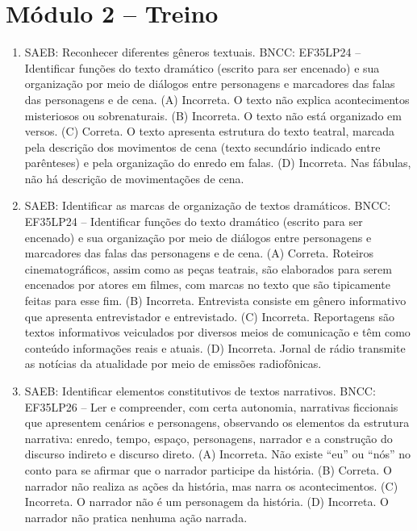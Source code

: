 \section*{Módulo 2 – Treino}

\begin{enumerate}
\item
SAEB: Reconhecer diferentes gêneros textuais.
BNCC: EF35LP24 -- Identificar funções do texto dramático (escrito para ser
encenado) e sua organização por meio de diálogos entre personagens e
marcadores das falas das personagens e de cena.
(A) Incorreta. O texto não explica acontecimentos misteriosos ou
sobrenaturais.
(B) Incorreta. O texto não está organizado em versos.
(C) Correta. O texto apresenta estrutura do texto teatral, marcada pela
descrição dos movimentos de cena (texto secundário indicado entre
parênteses) e pela organização do enredo em falas.
(D) Incorreta. Nas fábulas, não há descrição de movimentações de cena.

\item
SAEB: Identificar as marcas de organização de textos dramáticos.
BNCC: EF35LP24 -- Identificar funções do texto dramático (escrito para
ser encenado) e sua organização por meio de diálogos entre personagens e
marcadores das falas das personagens e de cena.
(A) Correta. Roteiros cinematográficos, assim como as peças teatrais,
são elaborados para serem encenados por atores em filmes, com marcas
no texto que são tipicamente feitas para esse fim.
(B) Incorreta. Entrevista consiste em gênero informativo que apresenta
entrevistador e entrevistado.
(C) Incorreta. Reportagens são textos informativos veiculados por
diversos meios de comunicação e têm como conteúdo informações reais e
atuais.
(D) Incorreta. Jornal de rádio transmite as notícias da atualidade por
meio de emissões radiofônicas.

\item
SAEB: Identificar elementos constitutivos de textos narrativos.
BNCC: EF35LP26 -- Ler e compreender, com certa autonomia, narrativas
ficcionais que apresentem cenários e personagens, observando os
elementos da estrutura narrativa: enredo, tempo, espaço, personagens,
narrador e a construção do discurso indireto e discurso direto.
(A) Incorreta. Não existe ``eu'' ou ``nós'' no conto para se afirmar
que o narrador participe da história.
(B) Correta. O narrador não realiza as ações da história, mas narra os
acontecimentos.
(C) Incorreta. O narrador não é um personagem da história.
(D) Incorreta. O narrador não pratica nenhuma ação narrada.
\end{enumerate}

